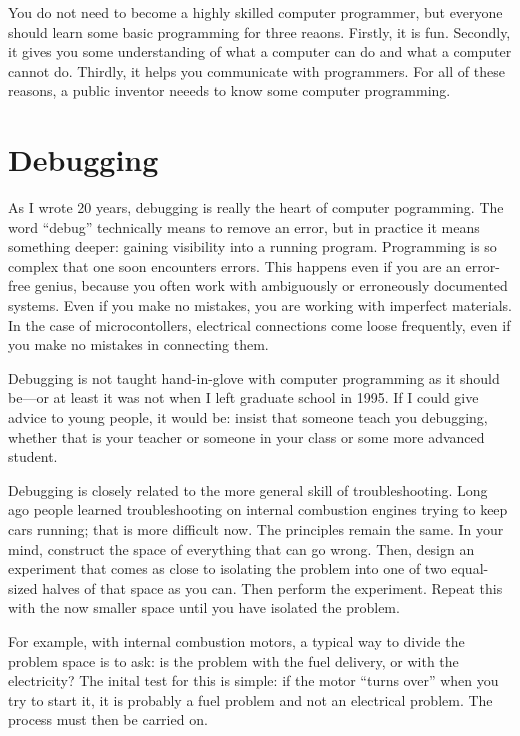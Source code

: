 \documentclass[
	fontsize=10pt, %
	twoside=false, %
	secnumdepth=1, %
]{kaobook}
\begin{document}
You do not need to
become a highly skilled computer programmer, but
everyone should learn some basic programming for three reaons.
Firstly, it is fun.
Secondly, it gives you some understanding of what a computer
can do and what a computer cannot do.
Thirdly, it helps you communicate with programmers.
For all of these reasons, a public inventor neeeds to know
some computer programming.

\section{Debugging}

As I wrote 20 years\cite{HowToBeAProgrammer}, debugging
is really the heart of computer pogramming.
The word ``debug'' technically means to remove an error,
but in practice it means something deeper: gaining visibility
into a running program. Programming is so complex that one soon
encounters errors. This happens even if you are an error-free genius,
because you often work with ambiguously or erroneously documented systems.
Even if you make no mistakes, you are working with imperfect materials.
In the case of microcontollers, electrical connections come loose
frequently, even if you make no mistakes in connecting them.

Debugging is not taught hand-in-glove with computer programming
as it should be---or at least it was not when I left graduate school in 1995.
If I could give advice to young people, it would be: insist that someone
teach you debugging, whether that is your teacher or someone in your class
or some more advanced student.

Debugging is closely related to the more general skill of troubleshooting.
Long ago people learned troubleshooting on internal combustion engines
trying to keep cars running; that is more difficult now. The principles
remain the same. In your mind, construct the space of everything that can
go wrong. Then, design an experiment that comes as close to isolating the
problem into one of two equal-sized halves of that space as you can.
Then perform the experiment. Repeat this with the now smaller space until
you have isolated the problem.

For example, with internal combustion motors, a typical way to divide the problem space is
to ask: is the problem with the fuel delivery, or with the electricity?
The inital test for this is simple: if the motor ``turns over'' when you try to start it,
it is probably a fuel problem and not an electrical problem.  The process must then be carried on.
\end{document}
